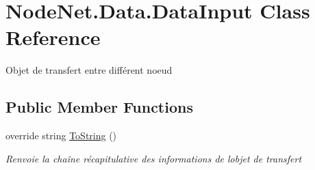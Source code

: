 \hypertarget{class_node_net_1_1_data_1_1_data_input}{}\section{Node\+Net.\+Data.\+Data\+Input Class Reference}
\label{class_node_net_1_1_data_1_1_data_input}


Objet de transfert entre différent noeud  


\subsection*{Public Member Functions}
\begin{DoxyCompactItemize}
\item 
override string \hyperlink{class_node_net_1_1_data_1_1_data_input_aa23bde4ee4b72c84387aab337088e847}{To\+String} ()
\begin{DoxyCompactList}\small\item\em Renvoie la chaîne récapitulative des informations de l\textquotesingle{}objet de transfert \end{DoxyCompactList}\end{DoxyCompactItemize}

